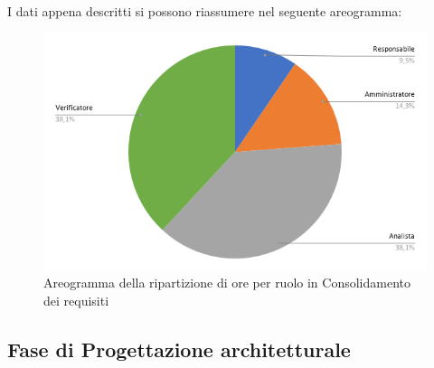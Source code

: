 I dati appena descritti si possono riassumere nel seguente areogramma:
\begin{figure}[!h]
    \vspace{5px}
    \includegraphics[scale=0.5]{../../../Images/Diagrammi/Diagramma a torta/ore requisiti.png}
    \centering
    \caption{Areogramma della ripartizione di ore per ruolo in Consolidamento dei requisiti}
\end{figure}



\subsection{Fase di Progettazione architetturale}
